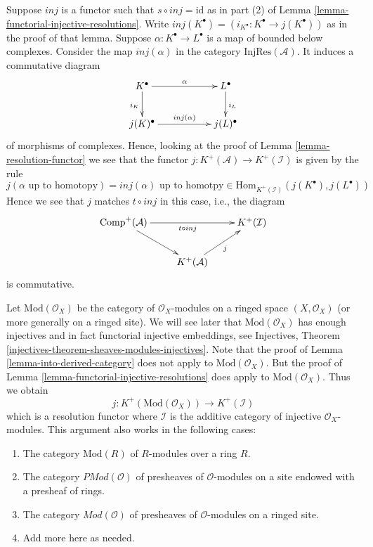 \begin{remark}
\label{remark-match}
Suppose $inj$ is a functor such that $s \circ inj = \text{id}$
as in part (2) of
Lemma \ref{lemma-functorial-injective-resolutions}.
Write $inj(K^\bullet) = (i_{K^\bullet} : K^\bullet \to j(K^\bullet))$
as in the proof of that lemma.
Suppose $\alpha : K^\bullet \to L^\bullet$ is a map
of bounded below complexes. Consider the map
$inj(\alpha)$ in the category $\text{InjRes}(\mathcal{A})$.
It induces a commutative diagram
$$
\xymatrix{
K^\bullet
\ar[rr]^-{\alpha}
\ar[d]_{i_K} & &
L^\bullet \ar[d]^{i_L} \\
j(K)^\bullet
\ar[rr]^-{inj(\alpha)}
& &
j(L)^\bullet
}
$$
of morphisms of complexes.
Hence, looking at the proof of
Lemma \ref{lemma-resolution-functor}
we see that the functor $j : K^{+}(\mathcal{A}) \to K^{+}(\mathcal{I})$
is given by the rule
$$
j(\alpha\text{ up to homotopy}) = inj(\alpha)\text{ up to homotpy}\in
\text{Hom}_{K^{+}(\mathcal{I})}(j(K^\bullet), j(L^\bullet))
$$
Hence we see that $j$ matches $t \circ inj$ in this case, i.e., the
diagram
$$
\xymatrix{
\text{Comp}^{+}(\mathcal{A}) \ar[rr]_{t \circ inj} \ar[rd] & &
K^{+}(\mathcal{I}) \\
& K^{+}(\mathcal{A}) \ar[ru]_j
}
$$
is commutative.
\end{remark}

\begin{remark}
\label{remark-big-abelian-category}
Let $\text{Mod}(\mathcal{O}_X)$ be the category of $\mathcal{O}_X$-modules
on a ringed space $(X, \mathcal{O}_X)$ (or more generally on a
ringed site). We will see later that $\text{Mod}(\mathcal{O}_X)$ has enough
injectives and in fact functorial injective embeddings, see
Injectives, Theorem \ref{injectives-theorem-sheaves-modules-injectives}.
Note that the proof of Lemma \ref{lemma-into-derived-category} does
not apply to $\text{Mod}(\mathcal{O}_X)$. But the proof of
Lemma \ref{lemma-functorial-injective-resolutions} does apply
to $\text{Mod}(\mathcal{O}_X)$. Thus we obtain
$$
j : K^{+}(\text{Mod}(\mathcal{O}_X))
\longrightarrow
K^{+}(\mathcal{I})
$$
which is a resolution functor where $\mathcal{I}$ is the additive
category of injective $\mathcal{O}_X$-modules. This argument also
works in the following cases:
\begin{enumerate}
\item The category $\text{Mod}(R)$ of $R$-modules over a ring $R$.
\item The category $\textit{PMod}(\mathcal{O})$ of presheaves of
$\mathcal{O}$-modules on a site endowed with a presheaf of rings.
\item The category $\textit{Mod}(\mathcal{O})$ of presheaves of
$\mathcal{O}$-modules on a ringed site.
\item Add more here as needed.
\end{enumerate}
\end{remark}









